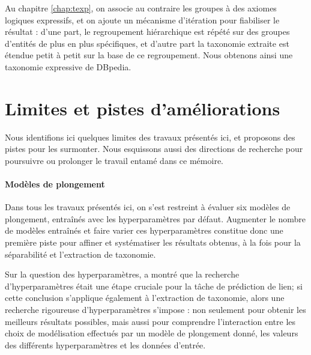 Au chapitre \ref{chap:texp}, on associe au contraire les groupes à des axiomes logiques expressifs, et on ajoute un mécanisme d'itération pour fiabiliser le résultat : d'une part, le regroupement hiérarchique est répété sur des groupes d'entités de plus en plus spécifiques, et d'autre part la taxonomie extraite est étendue petit à petit sur la base de ce regroupement. Nous obtenons ainsi une taxonomie expressive de DBpedia.






\section{Limites et pistes d'améliorations}
\label{sec:ccl-limits}
Nous identifions ici quelques limites des travaux présentés ici, et proposons des pistes pour les surmonter. Nous esquissons aussi des directions de recherche pour poursuivre ou prolonger le travail entamé dans ce mémoire.


\paragraph{Modèles de plongement}

Dans tous les travaux présentés ici, on s'est restreint à évaluer six modèles de plongement, entraînés avec les hyperparamètres par défaut. Augmenter le nombre de modèles entraînés et faire varier ces hyperparamètres constitue donc une première piste pour affiner et systématiser les résultats obtenus, à la fois pour la séparabilité et l'extraction de taxonomie. 

Sur la question des hyperparamètres, \cite{kadlec2017knowledge} a montré que la recherche d'hyperparamètres était une étape cruciale pour la tâche de prédiction de lien; si cette conclusion s'applique également à l'extraction de taxonomie, alors une recherche rigoureuse d'hyperparamètres s'impose : non seulement pour obtenir les meilleurs résultats possibles, mais aussi pour comprendre l'interaction entre les choix de modélisation effectués par un modèle de plongement donné, les valeurs des différents hyperparamètres et les données d'entrée. 

